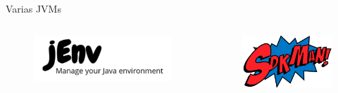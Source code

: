 \documentclass[aspectratio=169]{beamer}
\begin{document}
\begin{frame}[fragile]{Varias JVMs}
\begin{columns}[T] %

    \begin{column}[T]{5cm} %
        \begin{figure}
            \centering
            \includegraphics[width=\linewidth]{Images/jenv}
        \end{figure}
    \end{column}
    \begin{column}[T]{6cm} %
        \begin{figure}
            \centering
            \includegraphics[width=\linewidth]{Images/sdkman}
        \end{figure}
    \end{column}
\end{columns}
\end{frame}
\end{document}

